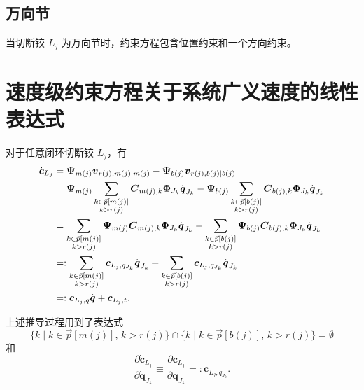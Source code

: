 \subsection{万向节}

当切断铰 $L_j$ 为万向节时，约束方程包含位置约束和一个方向约束。

\section{速度级约束方程关于系统广义速度的线性表达式}

对于任意闭环切断铰 $L_j$，有
\begin{align}
  \dot{\boldsymbol{c}}_{L_j} &= \boldsymbol{\Psi}_{m(j)} \boldsymbol{v}_{r(j),m(j) \mid m(j)} - \boldsymbol{\Psi}_{b(j)} \boldsymbol{v}_{r(j),b(j) \mid b(j)} \label{eq:10.59} \\
  &= \boldsymbol{\Psi}_{m(j)} \sum_{\substack{k \in \vec{p}[m(j)] \\ k > r(j)}} \boldsymbol{C}_{m(j),k} \boldsymbol{\Phi}_{J_k} \dot{\boldsymbol{q}}_{J_k} - \boldsymbol{\Psi}_{b(j)} \sum_{\substack{k \in \vec{p}[b(j)] \\ k > r(j)}} \boldsymbol{C}_{b(j),k} \boldsymbol{\Phi}_{J_k} \dot{\boldsymbol{q}}_{J_k} \notag \\
  &= \sum_{\substack{k \in \vec{p}[m(j)] \\ k > r(j)}} \boldsymbol{\Psi}_{m(j)} \boldsymbol{C}_{m(j),k} \boldsymbol{\Phi}_{J_k} \dot{\boldsymbol{q}}_{J_k} - \sum_{\substack{k \in \vec{p}[b(j)] \\ k > r(j)}} \boldsymbol{\Psi}_{b(j)} \boldsymbol{C}_{b(j),k} \boldsymbol{\Phi}_{J_k} \dot{\boldsymbol{q}}_{J_k} \notag \\
  &=: \sum_{\substack{k \in \vec{p}[m(j)] \\ k > r(j)}} \boldsymbol{c}_{L_j,q_{J_k}} \dot{\boldsymbol{q}}_{J_k} + \sum_{\substack{k \in \vec{p}[b(j)] \\ k > r(j)}} \boldsymbol{c}_{L_j,q_{J_k}} \dot{\boldsymbol{q}}_{J_k} \notag \\
  &=: \boldsymbol{c}_{L_j,q} \dot{\boldsymbol{q}} + \boldsymbol{c}_{L_j,t}.
\end{align}

上述推导过程用到了表达式
\begin{equation}\label{eq:10.60}
  \{k \mid k \in \vec{p}[m(j)],\, k > r(j)\} \cap \{k \mid k \in \vec{p}[b(j)],\, k > r(j)\} = \emptyset
\end{equation}
和
\begin{equation}\label{eq:10.61}
  \frac{\partial \dot{\boldsymbol{c}}_{L_j}}{\partial \dot{\boldsymbol{q}}_{J_k}} \equiv \frac{\partial \boldsymbol{c}_{L_j}}{\partial \boldsymbol{q}_{J_k}} =: \boldsymbol{c}_{L_j,q_{J_k}}.
\end{equation}

